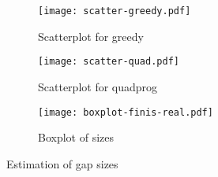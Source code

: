 \documentclass[12pt]{amsart}
\begin{document}
\begin{figure}[h!]
  \centering

    \begin{subfigure}{230pt}
    \centering
      \texttt{[image: scatter-greedy.pdf]}
      \caption{Scatterplot for greedy}
    \end{subfigure}%
    \begin{subfigure}{230pt}
      \texttt{[image: scatter-quad.pdf]}
      \caption{Scatterplot for quadprog}
    \end{subfigure}

    \begin{subfigure}{400pt}
      \texttt{[image: boxplot-finis-real.pdf]}
      \caption{Boxplot of sizes}
    \end{subfigure}

  \caption{Estimation of gap sizes}
\end{figure}
\end{document}
